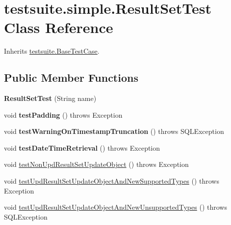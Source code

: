 \hypertarget{classtestsuite_1_1simple_1_1_result_set_test}{}\section{testsuite.\+simple.\+Result\+Set\+Test Class Reference}
\label{classtestsuite_1_1simple_1_1_result_set_test}


Inherits \mbox{\hyperlink{classtestsuite_1_1_base_test_case}{testsuite.\+Base\+Test\+Case}}.

\subsection*{Public Member Functions}
\begin{DoxyCompactItemize}
\item 
\mbox{\label{classtestsuite_1_1simple_1_1_result_set_test_a88a576d293713b9a39cd1a25dba38cbe}} 
{\bfseries Result\+Set\+Test} (String name)
\item 
\mbox{\label{classtestsuite_1_1simple_1_1_result_set_test_acf1c1c4e051b0f5eb985231600a7de9a}} 
void {\bfseries test\+Padding} ()  throws Exception 
\item 
\mbox{\label{classtestsuite_1_1simple_1_1_result_set_test_a3331de6ce65d06bf37a254212a523c04}} 
void {\bfseries test\+Warning\+On\+Timestamp\+Truncation} ()  throws S\+Q\+L\+Exception 
\item 
\mbox{\label{classtestsuite_1_1simple_1_1_result_set_test_aba088a225308a47faf9f0e114d00b027}} 
void {\bfseries test\+Date\+Time\+Retrieval} ()  throws Exception 
\item 
void \mbox{\hyperlink{classtestsuite_1_1simple_1_1_result_set_test_a2e5dc65318a18c87b40ae21b41e9d45d}{test\+Non\+Upd\+Result\+Set\+Update\+Object}} ()  throws Exception 
\item 
void \mbox{\hyperlink{classtestsuite_1_1simple_1_1_result_set_test_aef6c6e08cd7de63e466950bf0319caa7}{test\+Upd\+Result\+Set\+Update\+Object\+And\+New\+Supported\+Types}} ()  throws Exception 
\item 
void \mbox{\hyperlink{classtestsuite_1_1simple_1_1_result_set_test_a4e3fe7ab9df657bbffdfb5110ad408e6}{test\+Upd\+Result\+Set\+Update\+Object\+And\+New\+Unsupported\+Types}} ()  throws S\+Q\+L\+Exception 
\end{DoxyCompactItemize}
